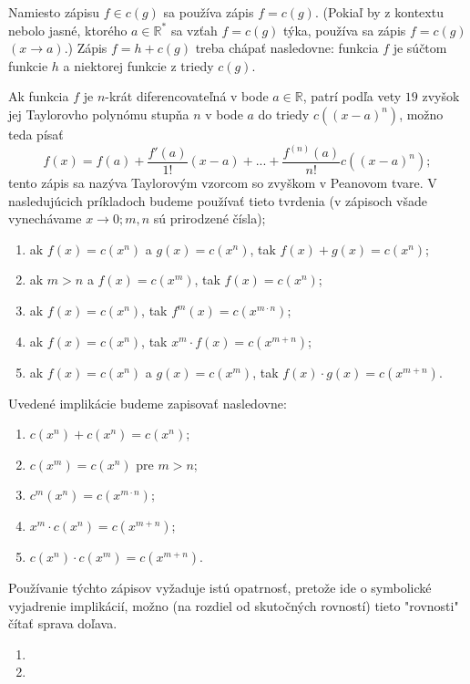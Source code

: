 Namiesto zápisu $f\in c(g)$ sa používa zápis $f=c(g)$. (Pokiaľ by z kontextu nebolo jasné, ktorého $a\in\mathbb{R^*}$ sa vzťah $f=c(g)$ týka, používa sa zápis $f=c(g)$ $(x\rightarrow a).$) Zápis $f=h+c(g)$ treba chápať nasledovne: funkcia $f$ je súčtom funkcie $h$ a niektorej funkcie z triedy $c(g)$. 

Ak funkcia $f$ je $n$-krát diferencovateľná v bode $a\in\mathbb{R}$, patrí podľa vety $19$ zvyšok jej Taylorovho polynómu stupňa $n$ v bode $a$ do triedy $c((x-a)^n)$, možno teda písať 
$$f(x)=f(a)+\frac{f'(a)}{1!}(x-a)+...+\frac{f^{(n)}(a)}{n!}c((x-a)^n);$$
tento zápis sa nazýva Taylorovým vzorcom so zvyškom v Peanovom tvare.
V nasledujúcich príkladoch budeme používať tieto tvrdenia (v zápisoch všade vynechávame $x\rightarrow 0;m,n$ sú prirodzené čísla);
\begin{enumerate}
\item ak $f(x)=c(x^n)$ a $g(x)=c(x^n)$, tak $f(x)+g(x)=c(x^n)$;
\item ak $m>n$ a $f(x)=c(x^m)$, tak $f(x)=c(x^n)$;
\item ak $f(x)=c(x^n)$, tak $f^m(x)=c(x^{m\cdot n})$;
\item ak $f(x)=c(x^n)$, tak $x^m\cdot f(x)=c(x^{m+n})$;
\item ak $f(x)=c(x^n)$ a $g(x)=c(x^m)$, tak $f(x)\cdot g(x)=c(x^{m+n})$.
\end{enumerate}

Uvedené implikácie budeme zapisovať nasledovne:
\begin{enumerate}
\item $c(x^n)+c(x^n)=c(x^n)$;
\item $c(x^m)=c(x^n)$ pre $m>n$;
\item $c^m(x^n)=c(x^{m\cdot n})$;
\item $x^m\cdot c(x^n)=c(x^{m+n})$;
\item $c(x^n)\cdot c(x^m)=c(x^{m+n})$.
\end{enumerate}

Používanie týchto zápisov vyžaduje istú opatrnosť, pretože ide o symbolické vyjadrenie implikácií, možno (na rozdiel od skutočných rovností) tieto "rovnosti" čítať sprava doľava.

\begin{enumerate}[resume]
	\item {}
	\item {}
\end{enumerate}

